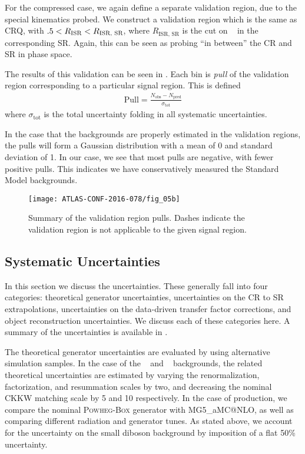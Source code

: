 For the compressed case, we again define a separate validation region, due to the special kinematics probed.
We construct a validation region which is the same as CRQ, with $.5 < R_{\text{ISR}} < R_{\text{ISR, SR}}$, where $R_{\text{ISR, SR}}$ is the cut on \risr~ in the corresponding SR.
Again, this can be seen as probing ``in between'' the CR and SR in phase space.

The results of this validation can be seen in .
Each bin is \textit{pull} of the validation region corresponding to a particular signal region.
This is defined
\begin{align}
\text{Pull} = \frac{N_{\mathrm{obs}} - N_{\mathrm{pred}}}{\sigma_{\mathrm{tot}}}
\end{align}
where $\sigma_{\mathrm{tot}}$ is the total uncertainty folding in all systematic uncertainties.

In the case that the backgrounds are properly estimated in the validation regions, the pulls will form a Gaussian distribution with a mean of 0 and standard deviation of 1.
In our case, we see that most pulls are negative, with fewer positive pulls.
This indicates we have conservatively measured the Standard Model backgrounds.

\begin{figure}[tbp]
\caption{Summary of the validation region pulls.
Dashes indicate the validation region is not applicable to the given signal region.} \label{fig:vr_summary}
\texttt{[image: ATLAS-CONF-2016-078/fig\_05b]}
\end{figure}

\subsection{Systematic Uncertainties}

In this section we discuss the uncertainties.
These generally fall into four categories: theoretical generator uncertainties, uncertainties on the CR to SR extrapolations, uncertainties on the data-driven transfer factor corrections, and object reconstruction uncertainties.
We discuss each of these categories here.
A summary of the uncertainties is available in .


The theoretical generator uncertainties are evaluated by using alternative simulation samples.
In the case of the \zjets~ and \wjets~ backgrounds, the related theoretical uncertainties are estimated by varying the renormalization, factorization, and resummation scales by two, and decreasing the nominal CKKW matching scale by 5 \GeV and 10 \GeV respectively.
In the case of \ttbar production, we compare the nominal \textsc{Powheg-Box} generator with MG5\_aMC@NLO, as well as comparing different radiation and generator tunes.
As stated above, we account for the uncertainty on the small diboson background by imposition of a flat 50\% uncertainty.

